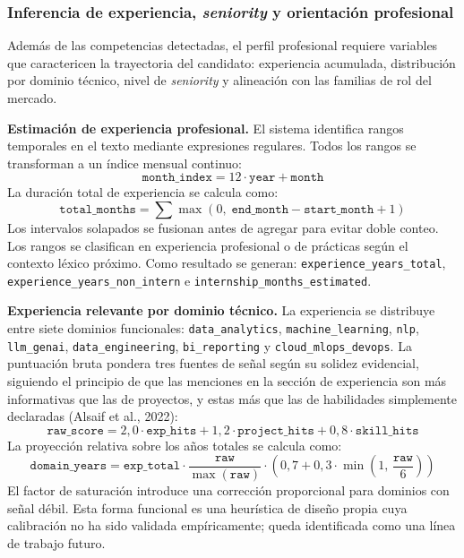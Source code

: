 \subsubsection{Inferencia de experiencia, \textit{seniority} y orientación profesional}
\label{subsubsec:inferencia_seniority}
Además de las competencias detectadas, el perfil profesional requiere variables que caractericen la trayectoria del candidato: experiencia acumulada, distribución por dominio técnico, nivel de \textit{seniority} y alineación con las familias de rol del mercado.

\textbf{Estimación de experiencia profesional.} El sistema identifica rangos temporales en el texto mediante expresiones regulares. Todos los rangos se transforman a un índice mensual continuo:
\[
  \texttt{month\_index} = 12 \cdot \texttt{year} + \texttt{month}
\]
La duración total de experiencia se calcula como:
\[
  \texttt{total\_months} = \sum \max(0,\; \texttt{end\_month} - \texttt{start\_month} + 1)
\]
Los intervalos solapados se fusionan antes de agregar para evitar doble conteo. Los rangos se clasifican en experiencia profesional o de prácticas según el contexto léxico próximo. Como resultado se generan: \texttt{experience\_years\_total}, \texttt{experience\_years\_non\_intern} e \texttt{internship\_months\_estimated}.

\textbf{Experiencia relevante por dominio técnico.} La experiencia se distribuye entre siete dominios funcionales: \texttt{data\_analytics}, \texttt{machine\_learning}, \texttt{nlp}, \texttt{llm\_genai}, \texttt{data\_engineering}, \texttt{bi\_reporting} y \texttt{cloud\_mlops\_devops}. La puntuación bruta pondera tres fuentes de señal según su solidez evidencial, siguiendo el principio de que las menciones en la sección de experiencia son más informativas que las de proyectos, y estas más que las de habilidades simplemente declaradas (Alsaif et al., 2022):
\[
  \texttt{raw\_score} = 2{,}0 \cdot \texttt{exp\_hits} + 1{,}2 \cdot \texttt{project\_hits} + 0{,}8 \cdot \texttt{skill\_hits}
\]
La proyección relativa sobre los años totales se calcula como:
\[
  \texttt{domain\_years} = \texttt{exp\_total} \cdot \frac{\texttt{raw}}{\max(\texttt{raw})} \cdot \left(0{,}7 + 0{,}3 \cdot \min\!\left(1,\, \frac{\texttt{raw}}{6}\right)\right)
\]
El factor de saturación introduce una corrección proporcional para dominios con señal débil. Esta forma funcional es una heurística de diseño propia cuya calibración no ha sido validada empíricamente; queda identificada como una línea de trabajo futuro.

